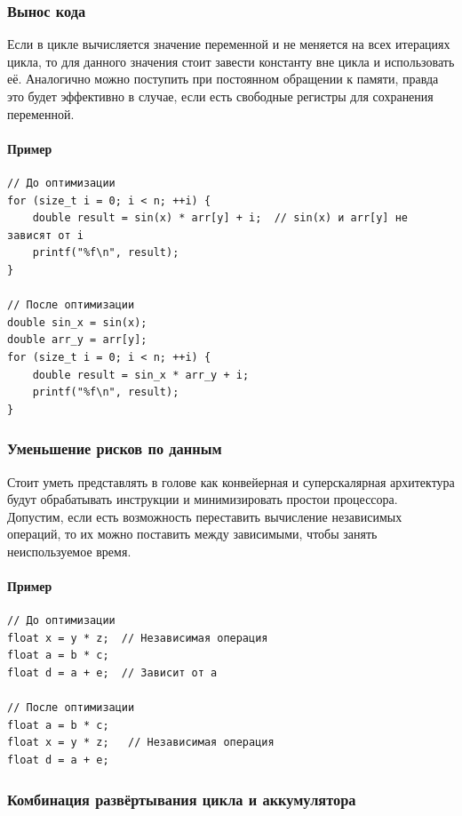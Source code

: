 \documentclass[12pt,a4paper]{article}
\begin{document}
\subsubsection{Вынос кода}

Если в цикле вычисляется значение переменной и не меняется на всех итерациях цикла, то для данного значения стоит завести константу вне цикла и использовать её. Аналогично можно поступить при постоянном обращении к памяти, правда это будет эффективно в случае, если есть свободные регистры для сохранения переменной.

\newpage

\paragraph{Пример}
\begin{verbatim}
// До оптимизации
for (size_t i = 0; i < n; ++i) {
    double result = sin(x) * arr[y] + i;  // sin(x) и arr[y] не зависят от i
    printf("%f\n", result);
}

// После оптимизации
double sin_x = sin(x);
double arr_y = arr[y];
for (size_t i = 0; i < n; ++i) {
    double result = sin_x * arr_y + i;
    printf("%f\n", result);
}
\end{verbatim}

\subsubsection{Уменьшение рисков по данным}

Стоит уметь представлять в голове как конвейерная и суперскалярная архитектура будут обрабатывать инструкции и минимизировать простои процессора. Допустим, если есть возможность переставить вычисление независимых операций, то их можно поставить между зависимыми, чтобы занять неиспользуемое время.

\newpage

\paragraph{Пример}
\begin{verbatim}
// До оптимизации
float x = y * z;  // Независимая операция
float a = b * c;
float d = a + e;  // Зависит от a

// После оптимизации
float a = b * c;
float x = y * z;   // Независимая операция
float d = a + e;
\end{verbatim}

\subsubsection{Комбинация развёртывания цикла и аккумулятора}
\indent
\end{document}
